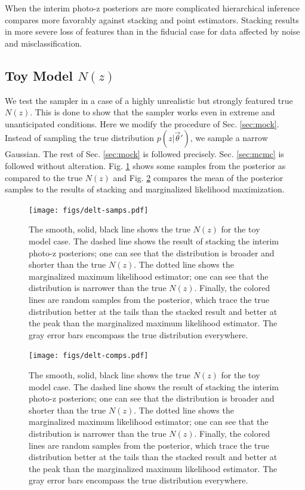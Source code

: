 \documentclass[preprint]{aastex}
\begin{document}
When the interim photo-z posteriors are more complicated hierarchical inference 
compares more favorably against stacking and point estimators.   Stacking 
results in more severe loss of features than in the fiducial case for data 
affected by noise and misclassification.  

\clearpage
\subsection{Toy Model $N(z)$}
\label{sec:fake}

We test the sampler in a case of a highly unrealistic but strongly featured 
true $N(z)$.  This is done to show that the sampler works even in extreme and 
unanticipated conditions.  Here we modify the procedure of Sec. \ref{sec:mock}. 
 Instead of sampling the true distribution $p(z|\vec{\theta}')$, we sample a 
narrow Gaussian.  The rest of Sec. \ref{sec:mock} is followed precisely.  Sec. 
\ref{sec:mcmc} is followed without alteration.  Fig. \ref{fig:toy-samp} shows 
some samples from the posterior as compared to the true $N(z)$ and Fig. 
\ref{fig:toy-comp} compares the mean of the posterior samples to the results of 
stacking and marginalized likelihood maximization.

\begin{figure}
\texttt{[image: figs/delt-samps.pdf]}
\caption{The smooth, solid, black line shows the true $N(z)$ for the toy model 
case.  The dashed line shows the result of stacking the interim photo-z 
posteriors; one can see that the distribution is broader and shorter than the 
true $N(z)$.  The dotted line shows the marginalized maximum likelihood 
estimator; one can see that the distribution is narrower than the true $N(z)$.  
Finally, the colored lines are random samples from the posterior, which trace 
the true distribution better at the tails than the stacked result and better at 
the peak than the marginalized maximum likelihood estimator.  The gray error 
bars encompass the true distribution everywhere.}
\label{fig:toy-samp}
\end{figure}

\begin{figure}
\texttt{[image: figs/delt-comps.pdf]}
\caption{The smooth, solid, black line shows the true $N(z)$ for the toy model 
case.  The dashed line shows the result of stacking the interim photo-z 
posteriors; one can see that the distribution is broader and shorter than the 
true $N(z)$.  The dotted line shows the marginalized maximum likelihood 
estimator; one can see that the distribution is narrower than the true $N(z)$.  
Finally, the colored lines are random samples from the posterior, which trace 
the true distribution better at the tails than the stacked result and better at 
the peak than the marginalized maximum likelihood estimator.  The gray error 
bars encompass the true distribution everywhere.}
\label{fig:toy-comp}
\end{figure}
\end{document}
